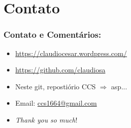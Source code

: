 \documentclass{beamer}
\begin{document}
\section*{Contato}

\begin{frame}
\frametitle{Contato e Comentários:}
  
\begin{block}{}
  \begin{itemize}
  \item \url{https://claudiocesar.wordpress.com/}
   \item \url{https://github.com/claudiosa}
   \item Neste git, repostiório CCS $\Rightarrow$ asp...
    \item Email: \url{ccs1664@gmail.com}

  \item \textit{Thank you so much}!

  \end{itemize}
  \end{block}

\end{frame}


\end{document}
